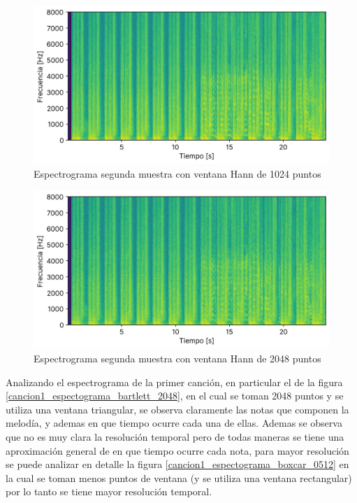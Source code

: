 \documentclass[12pt]{article}
\begin{document}
\begin{figure}[H]
\centering
\includegraphics{plot/cancion2_espectograma_hann_1024.png}
\caption{Espectrograma segunda muestra con ventana Hann de 1024 puntos}
\label{cancion2_espectograma_hann_1024}
\end{figure}

\begin{figure}[H]
\centering
\includegraphics{plot/cancion2_espectograma_hann_2048.png}
\caption{Espectrograma segunda muestra con ventana Hann de 2048 puntos}
\label{cancion2_espectograma_hann_2048}
\end{figure}
\fi

Analizando el espectrograma de la primer canción, en particular el de la figura \ref{cancion1_espectograma_bartlett_2048}, en el cual se toman 2048 puntos y se utiliza una ventana triangular, se observa claramente las notas que componen la melodía, y ademas en que tiempo ocurre cada una de ellas. Ademas se observa que no es muy clara la resolución temporal pero de todas maneras se tiene una aproximación general de en que tiempo ocurre cada nota, para mayor resolución se puede analizar en detalle la figura \ref{cancion1_espectograma_boxcar_0512} en la cual se toman menos puntos de ventana (y se utiliza una ventana rectangular) por lo tanto se tiene mayor resolución temporal.
\end{document}
